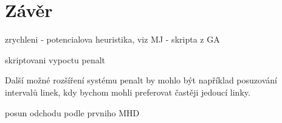 \chapter*{Závěr}

zrychleni - potencialova heuristika, viz MJ - skripta z GA

skriptovani vypoctu penalt

Další možné rozšíření systému penalt by mohlo být například posuzování intervalů
linek, kdy bychom mohli preferovat častěji jedoucí linky. 

posun odchodu podle prvniho MHD
